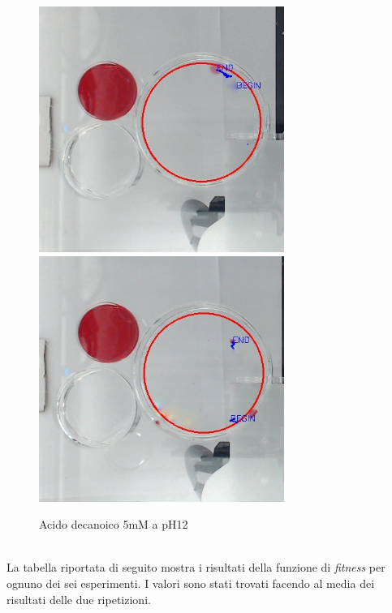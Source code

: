 \begin{figure}[h]
	\centering
   		{\includegraphics[width=8cm]{immagini/5mMpH12-1.jpg}}
 	\hspace{2mm}   	
		{\includegraphics[width=8cm]{immagini/5mMpH12-2.jpg}}
	\caption{Acido decanoico 5mM a pH12}
\end{figure}
\pagebreak
\\La tabella riportata di seguito mostra i risultati della funzione di \emph{fitness} per ognuno dei sei esperimenti. I valori sono stati trovati facendo al media dei risultati delle due ripetizioni.
